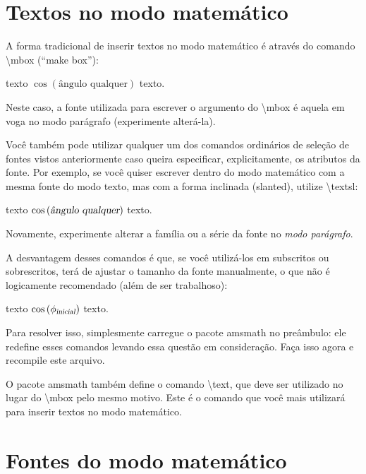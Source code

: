 \documentclass[a4paper,10pt]{article}
\newcommand{\pacote}[1]{{\color{orange!50!black}\normalfont#1}}
\newcommand{\comando}[1]{{\textbackslash\color{blue!70}\normalfont#1}}
\begin{document}
	\section*{Textos no modo matemático}

	A forma tradicional de inserir textos no modo matemático é através do
	comando \comando{mbox} (``make box''):
	
	\begin{center}
		texto \( \cos\left( \mbox{ângulo qualquer} \right) \) texto.
	\end{center}	
	Neste caso, a fonte utilizada para escrever o argumento do \comando{mbox}
	é aquela em voga no modo parágrafo (experimente alterá-la).
	
	
	Você também pode utilizar qualquer um dos comandos ordinários de seleção
	de fontes vistos anteriormente caso queira especificar, explicitamente,
	os atributos da fonte. Por exemplo, se você quiser escrever dentro do
	modo matemático com a mesma fonte do modo texto, mas com a forma inclinada
	(slanted), utilize \comando{textsl}:
	\begin{center}
		texto \( \cos\left( \textsl{ângulo qualquer} \right) \) texto.
	\end{center}	
	Novamente, experimente alterar a família ou a série da fonte no \emph{modo
	parágrafo}.
	
	A desvantagem desses comandos é que, se você utilizá-los em subscritos ou
	sobrescritos, terá de ajustar o tamanho da fonte manualmente, o que não é
	logicamente recomendado (além de ser trabalhoso):
	\begin{center}
		texto \( \cos\left( \phi_{\textsl{inicial}} \right) \) texto.
	\end{center}	
	
	Para resolver isso, simplesmente carregue o pacote \pacote{amsmath} no preâmbulo:
	ele redefine esses comandos levando essa questão em consideração. Faça isso agora
	e recompile este arquivo.
	
	O pacote \pacote{amsmath} também define o comando \comando{text}, que deve ser utilizado
	no lugar do \comando{mbox} pelo mesmo motivo. Este é o comando que você mais utilizará
	para inserir textos no modo matemático.

	\section*{Fontes do modo matemático}
	
\end{document}
